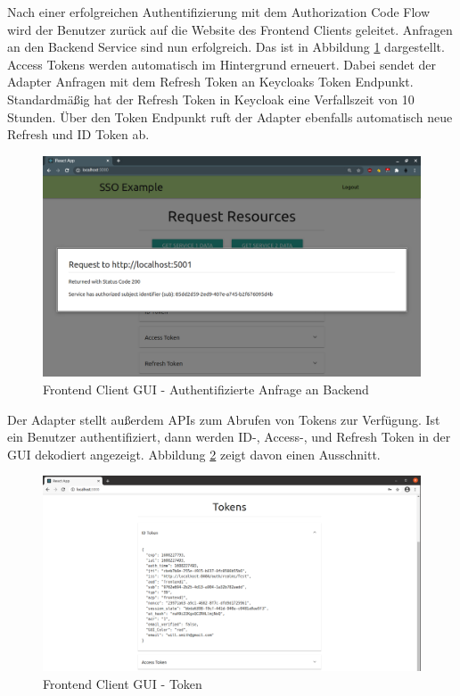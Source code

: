 Nach einer erfolgreichen Authentifizierung mit dem Authorization Code Flow wird der Benutzer zurück auf die Website des Frontend Clients geleitet. Anfragen an den Backend Service sind nun erfolgreich. Das ist in Abbildung \ref{fig:EB_Authentifizierte Anfrage an Backend} dargestellt. Access Tokens werden automatisch im Hintergrund erneuert. Dabei sendet der Adapter Anfragen mit dem Refresh Token an Keycloaks Token Endpunkt. Standardmäßig hat der Refresh Token in Keycloak eine Verfallszeit von 10 Stunden. Über den Token Endpunkt ruft der Adapter ebenfalls automatisch neue Refresh und ID Token ab.

\begin{figure}[!ht]
	\centering
	\includegraphics[width=1\textwidth]{Images/EbertScherer/FrontendLoggedInBackendRequest.PNG}
	\caption{Frontend Client GUI - Authentifizierte Anfrage an Backend}
	\label{fig:EB_Authentifizierte Anfrage an Backend}
\end{figure} 

Der Adapter stellt außerdem APIs zum Abrufen von Tokens zur Verfügung. Ist ein Benutzer authentifiziert, dann werden ID-, Access-, und Refresh Token in der GUI dekodiert angezeigt. Abbildung \ref{fig:EB_Token} zeigt davon einen Ausschnitt.

\begin{figure}[!ht]
	\centering
	\includegraphics[width=1\textwidth]{Images/EbertScherer/FrontendIDTokenExample.PNG}
	\caption{Frontend Client GUI - Token}
	\label{fig:EB_Token}
\end{figure}

